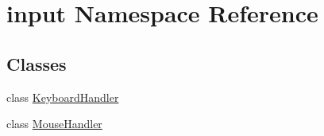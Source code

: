 \hypertarget{namespaceinput}{\section{input Namespace Reference}
\label{namespaceinput}
}
\subsection*{Classes}
\begin{DoxyCompactItemize}
\item 
class \hyperlink{classinput_1_1KeyboardHandler}{Keyboard\-Handler}
\item 
class \hyperlink{classinput_1_1MouseHandler}{Mouse\-Handler}
\end{DoxyCompactItemize}
